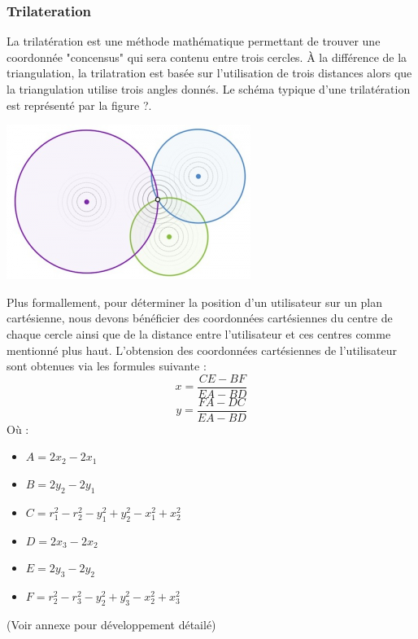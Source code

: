\documentclass[11pt,journal,compsoc]{IEEEtran}
\begin{document}
    \subsubsection{Trilateration}
      La trilatération est une méthode mathématique permettant de trouver une coordonnée "concensus" qui sera contenu entre trois cercles. À la différence de la triangulation, la trilatration est basée sur l'utilisation de trois distances alors que la triangulation utilise trois angles donnés. Le schéma typique d'une trilatération est représenté par la figure ?.
      \begin{center}
        \includegraphics[scale=0.8]{images/trilateration.png}
      \end{center}
      Plus formallement, pour déterminer la position d'un utilisateur sur un plan cartésienne, nous devons bénéficier des coordonnées cartésiennes du centre de chaque cercle ainsi que de la distance entre l'utilisateur et ces centres comme mentionné plus haut. L'obtension des coordonnées cartésiennes de l'utilisateur sont obtenues via les formules suivante :
      \begin{equation}
        x = \frac{CE-BF}{EA-BD}
      \end{equation}
      \begin{equation}
        y = \frac{FA-DC}{EA-BD}
      \end{equation}
      Où :
      \begin{itemize}
        \item $A = 2x_{2}-2x_{1}$
        \item $B = 2y_{2}-2y_{1}$
        \item $C = r_{1}^{2}-r_{2}^{2}-y_{1}^{2}+y_{2}^{2}-x_{1}^{2}+x_{2}^{2}$
        \item $D = 2x_{3}-2x_{2}$
        \item $E = 2y_{3}-2y_{2}$
        \item $F = r_{2}^{2}-r_{3}^{2}-y_{2}^{2}+y_{3}^{2}-x_{2}^{2}+x_{3}^{2}$
      \end{itemize}
      (Voir annexe pour développement détailé)\\
\end{document}
